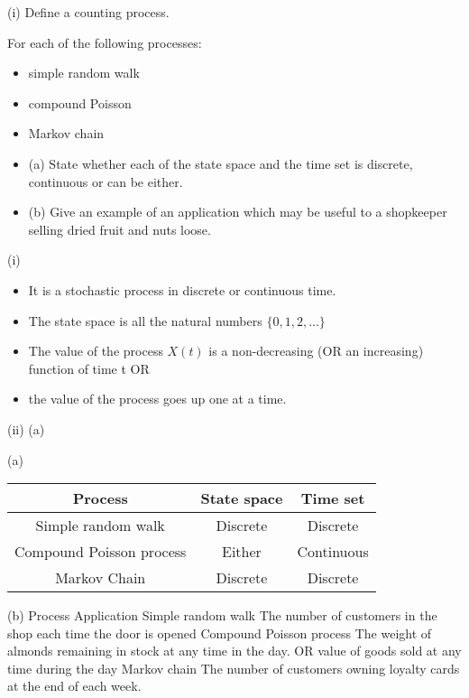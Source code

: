 \documentclass[a4paper,12pt]{article}
\begin{document}
(i) Define a counting process.

For each of the following processes:
\begin{itemize}
\item simple random walk
\item compound Poisson
\item Markov chain
\end{itemize}
\begin{itemize}
\item (a) State whether each of the state space and the time set is discrete,
continuous or can be either.
\item (b) Give an example of an application which may be useful to a
shopkeeper selling dried fruit and nuts loose.
\end{itemize}

\newpage

(i)
\begin{itemize}
\item It is a stochastic process in discrete or continuous time.
\item The state space is all the natural numbers $\{0, 1, 2, ... \}$
\item The value of the process $X(t)$ is a non-decreasing (OR an increasing) function of
time t
OR

\item the value of the process goes up one at a time.
\end{itemize}

(ii)
(a)


(a)
\begin{center}
\begin{tabular}{|c|c|c|}
Process  & State space & Time set \\ \hline
Simple random walk  & Discrete & Discrete \\
Compound Poisson process & Either & Continuous \\ \hline
Markov Chain & Discrete & Discrete \\ \hline
\end{tabular}
\end{center}
(b)
Process Application
Simple random walk The number of customers in the
shop each time the door is opened
Compound Poisson process The weight of almonds remaining in
stock at any time in the day.
OR
value of goods sold at any time during
the day
Markov chain
The number of customers owning
loyalty cards at the end of each week.


\end{document}
